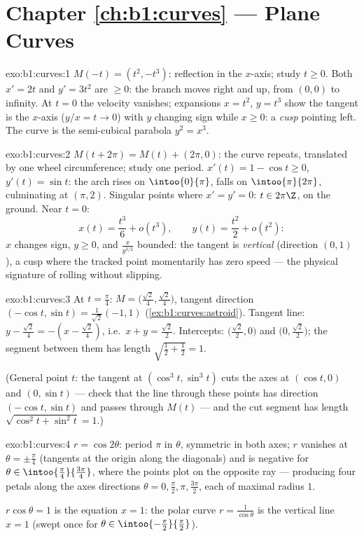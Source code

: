 \section*{Chapter \ref{ch:b1:curves} --- Plane Curves}

\begin{solution}{exo:b1:curves:1}
$M(-t) = (t^2, -t^3)$: reflection in the $x$-axis; study $t \geq 0$.
Both $x' = 2t$ and $y' = 3t^2$ are $\geq 0$: the branch moves
right and up, from $(0,0)$ to infinity. At $t = 0$ the velocity
vanishes; expansions $x = t^2$, $y = t^3$ show the tangent is the
$x$-axis ($y/x = t \to 0$) with $y$ changing sign while $x \geq 0$:
a \emph{cusp} pointing left. The curve is the semi-cubical parabola
$y^2 = x^3$.
\end{solution}

\begin{solution}{exo:b1:curves:2}
$M(t + 2\pi) = M(t) + (2\pi, 0)$: the curve repeats, translated by
one wheel circumference; study one period. $x'(t) = 1 - \cos t \geq
0$, $y'(t) = \sin t$: the arch rises on $\intoo{0}{\pi}$, falls on
$\intoo{\pi}{2\pi}$, culminating at $(\pi, 2)$. Singular points
where $x' = y' = 0$: $t \in 2\pi\Z$, on the ground. Near $t = 0$:
\[
x(t) = \frac{t^3}{6} + o(t^3),
\qquad
y(t) = \frac{t^2}{2} + o(t^2):
\]
$x$ changes sign, $y \geq 0$, and $\frac{x}{y^{3/2}}$ bounded: the
tangent is \emph{vertical} (direction $(0,1)$), a cusp where the
tracked point momentarily has zero speed --- the physical signature
of rolling without slipping.
\end{solution}

\begin{solution}{exo:b1:curves:3}
At $t = \frac\pi4$: $M = \bigl(\frac{\sqrt2}{4},
\frac{\sqrt2}{4}\bigr)$, tangent direction $(-\cos t, \sin t) =
\frac{1}{\sqrt2}(-1, 1)$ (\cref{ex:b1:curves:astroid}). Tangent
line: $y - \frac{\sqrt2}{4} = -(x - \frac{\sqrt2}{4})$, i.e.\ $x +
y = \frac{\sqrt2}{2}$. Intercepts: $\bigl(\frac{\sqrt2}{2},
0\bigr)$ and $\bigl(0, \frac{\sqrt2}{2}\bigr)$; the segment between
them has length $\sqrt{\frac12 + \frac12} = 1$.

(General point $t$: the tangent at $(\cos^3 t, \sin^3 t)$ cuts the
axes at $(\cos t, 0)$ and $(0, \sin t)$ --- check that the line
through these points has direction $(-\cos t, \sin t)$ and passes
through $M(t)$ --- and the cut segment has length $\sqrt{\cos^2 t +
\sin^2 t} = 1$.)
\end{solution}

\begin{solution}{exo:b1:curves:4}
$r = \cos 2\theta$: period $\pi$ in $\theta$, symmetric in both
axes; $r$ vanishes at $\theta = \pm\frac\pi4$ (tangents at the
origin along the diagonals) and is negative for $\theta \in
\intoo{\frac\pi4}{\frac{3\pi}{4}}$, where the points plot on the
opposite ray --- producing four petals along the axes directions
$\theta = 0, \frac\pi2, \pi, \frac{3\pi}{2}$, each of maximal
radius $1$.

$r\cos\theta = 1$ is the equation $x = 1$: the polar curve $r =
\frac{1}{\cos\theta}$ is the vertical line $x = 1$ (swept once for
$\theta \in \intoo{-\frac\pi2}{\frac\pi2}$).
\end{solution}

